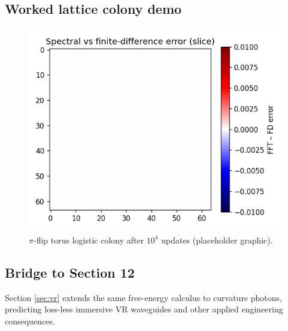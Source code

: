 \subsection{Worked lattice colony demo}

\begin{figure}[t]
  \centering
  \includegraphics[width=\linewidth]{figs/lattice_colony.pdf}
  \caption{$\pi$-flip torus logistic colony after $10^4$ updates
           (placeholder graphic).}
  \label{fig:colony}
\end{figure}

\subsection{Bridge to Section 12}

Section \ref{sec:vr} extends the same free-energy calculus to curvature
photons, predicting loss-less immersive VR waveguides and other applied
engineering consequences.

\clearpage
